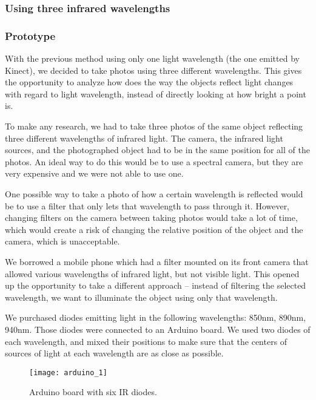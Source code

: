         \subsubsection{Using three infrared wavelengths}
            \subsubsection*{Prototype}
            With the previous method using only one light wavelength (the one emitted by
            Kinect), we decided to take photos using three different wavelengths.
            This gives the opportunity to analyze how does the way the objects reflect
            light changes with regard to light wavelength, instead of directly looking
            at how bright a point is.

            To make any research, we had to take three photos of the same object
            reflecting three different wavelengths of infrared light.
            The camera, the infrared light sources, and the photographed object
            had to be in the same position for all of the photos.
            An ideal way to do this would be to use a spectral camera, but they are
            very expensive and we were not able to use one.

            One possible way to take a photo of how a certain wavelength is reflected
            would be to use a filter that only lets that wavelength to pass through it.
            However, changing filters on the camera between taking photos would take
            a lot of time, which would create a risk of changing the relative position
            of the object and the camera, which is unacceptable.

            We borrowed a mobile phone which had a filter mounted on its front camera
            that allowed various wavelengths of infrared light, but not visible light.
            This opened up the opportunity to take a different approach -- instead
            of filtering the selected wavelength, we want to illuminate the object
            using only that wavelength.

            We purchased diodes emitting light in the following wavelengths:
            850nm, 890nm, 940nm. Those diodes were connected to an Arduino board.
            We used two diodes of each wavelength, and mixed their positions to
            make sure that the centers of sources of light at each wavelength
            are as close as possible.

            \begin{figure}[H]
                \caption{Arduino board with six IR diodes.}
                \centering
                \texttt{[image: arduino\_1]}
                \label{fig:arduino_1}
            \end{figure}

